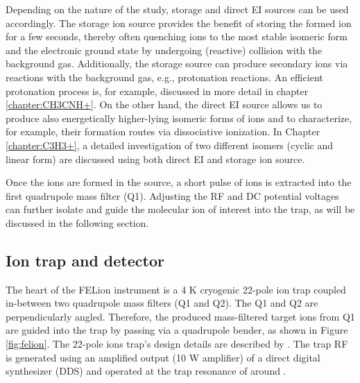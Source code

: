 Depending on the nature of the study, storage and direct EI sources can be used accordingly. The storage ion source provides the benefit of storing the formed ion for a few seconds, thereby often quenching ions to the most stable isomeric form  and the electronic ground state by undergoing (reactive) collision with the background gas. Additionally, the storage source can produce secondary ions via reactions with the background gas, e.g., protonation reactions. An efficient protonation process is, for example, discussed in more detail in chapter \ref{chapter:CH3CNH+}. On the other hand, the direct EI source allows us to produce also energetically higher-lying isomeric forms of ions and to characterize, for example, their formation routes via dissociative ionization. In Chapter \ref{chapter:C3H3+}, a detailed investigation of two different isomers (cyclic and linear form) are discussed using both direct EI and storage ion source.

Once the ions are formed in the source, a short pulse of ions is extracted into the first quadrupole mass filter (Q1). Adjusting the RF and DC potential voltages can further isolate and guide the molecular ion of interest into the trap, as will be discussed in the following section.

\subsection{Ion trap and detector}
\label{subsec:setup:ion-trap-and-detector}

The heart of the FELion instrument is a 4 K cryogenic 22-pole ion trap coupled in-between two quadrupole mass filters (Q1 and Q2). The Q1 and Q2 are perpendicularly angled. Therefore, the produced mass-filtered target ions from Q1 are guided into the trap by passing via a quadrupole bender, as shown in Figure \ref{fig:felion}. The 22-pole ions trap's design details are described by \citet{asvany_note_2010}. The trap RF is generated using an amplified output (10 W amplifier) of a direct digital synthesizer (DDS) and operated at the trap resonance of around .

